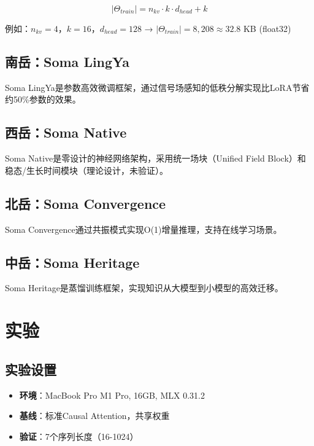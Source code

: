 \documentclass[12pt, a4paper]{article}
\begin{document}
\begin{equation}
|\Theta_{train}| = n_{kv} \cdot k \cdot d_{head} + k
\end{equation}

例如：$n_{kv} = 4$，$k = 16$，$d_{head} = 128$ → $|\Theta_{train}| = 8,208 ≈ 32.8$ KB (float32)

\subsection{南岳：Soma LingYa}

Soma LingYa是参数高效微调框架，通过信号场感知的低秩分解实现比LoRA节省约50\%参数的效果。

\subsection{西岳：Soma Native}

Soma Native是零设计的神经网络架构，采用统一场块（Unified Field Block）和稳态/生长时间模块（理论设计，未验证）。

\subsection{北岳：Soma Convergence}

Soma Convergence通过共振模式实现O(1)增量推理，支持在线学习场景。

\subsection{中岳：Soma Heritage}

Soma Heritage是蒸馏训练框架，实现知识从大模型到小模型的高效迁移。

\newpage

\section{实验}

\subsection{实验设置}

\begin{itemize}
    \item \textbf{环境}：MacBook Pro M1 Pro, 16GB, MLX 0.31.2
    \item \textbf{基线}：标准Causal Attention，共享权重
    \item \textbf{验证}：7个序列长度（16-1024）
\end{itemize}
\end{document}
